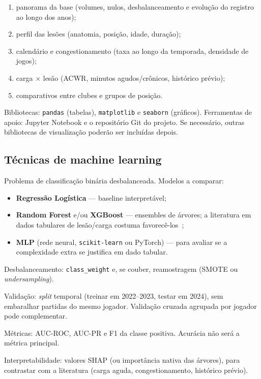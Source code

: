 \documentclass[11pt,a4paper]{article}
\begin{document}
\begin{enumerate}
  \item panorama da base (volumes, nulos, desbalanceamento e evolução do registro ao longo dos anos);
  \item perfil das lesões (anatomia, posição, idade, duração);
  \item calendário e congestionamento (taxa ao longo da temporada, densidade de jogos);
  \item carga $\times$ lesão (ACWR, minutos agudos/crônicos, histórico prévio);
  \item comparativos entre clubes e grupos de posição.
\end{enumerate}

Bibliotecas: \texttt{pandas} (tabelas), \texttt{matplotlib} e \texttt{seaborn} (gráficos). Ferramentas de apoio: Jupyter Notebook e o repositório Git do projeto. Se necessário, outras bibliotecas de visualização poderão ser incluídas depois.

\subsection{Técnicas de machine learning}

Problema de classificação binária desbalanceada. Modelos a comparar:

\begin{itemize}
  \item \textbf{Regressão Logística} --- baseline interpretável;
  \item \textbf{Random Forest} e/ou \textbf{XGBoost} --- ensembles de árvores; a literatura em dados tabulares de lesão/carga costuma favorecê-los~\cite{applsci2024};
  \item \textbf{MLP} (rede neural, \texttt{scikit-learn} ou PyTorch) --- para avaliar se a complexidade extra se justifica em dado tabular.
\end{itemize}

Desbalanceamento: \texttt{class\_weight} e, se couber, reamostragem (SMOTE ou \textit{undersampling}).

Validação: \textit{split} temporal (treinar em 2022--2023, testar em 2024), sem embaralhar partidas do mesmo jogador. Validação cruzada agrupada por jogador pode complementar.

Métricas: AUC-ROC, AUC-PR e F1 da classe positiva. Acurácia não será a métrica principal.

Interpretabilidade: valores SHAP (ou importância nativa das árvores), para contrastar com a literatura (carga aguda, congestionamento, histórico prévio).
\end{document}
